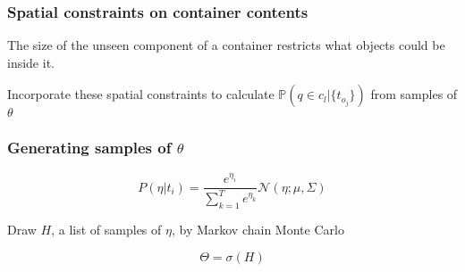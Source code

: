 \begin{frame}
  \frametitle{Spatial constraints on container contents}
  \begin{center}
    The size of the unseen component of a container restricts what objects could be
    inside it.
    \vspace{3em}

    Incorporate these spatial constraints to calculate 
    $\mathbb{P}(q \in c_l|\{t_{o_j}\})$
    from samples of $\theta$
  \end{center}
\end{frame}

\begin{frame}
  \frametitle{Generating samples of $\theta$}
  \begin{center}
    \vspace{-2em}
      \[P(\eta | t_i) =\frac{e^{\eta_i}}{\sum_{k=1}^{T}e^{\eta_k}} \mathcal{N}(\eta ; \mu, \Sigma)\]
    \vspace{1em}

    Draw $H$, a list of samples of $\eta$, by Markov chain Monte Carlo

    \[\Theta = \sigma \left(H \right)\]
  \end{center}
\end{frame}

